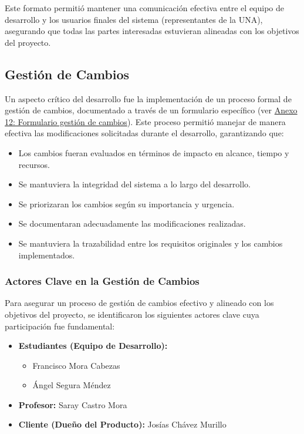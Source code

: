 Este formato permitió mantener una comunicación efectiva entre el equipo de desarrollo y los usuarios finales del sistema (representantes de la UNA), asegurando que todas las partes interesadas estuvieran alineadas con los objetivos del proyecto.

\subsection{Gestión de Cambios}
Un aspecto crítico del desarrollo fue la implementación de un proceso formal de gestión de cambios, documentado a través de un formulario específico (ver \hyperref[anexo:formulario_gestion_de_cambios]{Anexo 12: Formulario gestión de cambios}). Este proceso permitió manejar de manera efectiva las modificaciones solicitadas durante el desarrollo, garantizando que:

\begin{itemize}
    \item Los cambios fueran evaluados en términos de impacto en alcance, tiempo y recursos.
    \item Se mantuviera la integridad del sistema a lo largo del desarrollo.
    \item Se priorizaran los cambios según su importancia y urgencia.
    \item Se documentaran adecuadamente las modificaciones realizadas.
    \item Se mantuviera la trazabilidad entre los requisitos originales y los cambios implementados.
\end{itemize}

\subsubsection{Actores Clave en la Gestión de Cambios}
Para asegurar un proceso de gestión de cambios efectivo y alineado con los objetivos del proyecto, se identificaron los siguientes actores clave cuya participación fue fundamental:

\begin{itemize}
    \item \textbf{Estudiantes (Equipo de Desarrollo):}
        \begin{itemize}
            \item Francisco Mora Cabezas
            \item Ángel Segura Méndez
        \end{itemize}
    \item \textbf{Profesor:} Saray Castro Mora
    \item \textbf{Cliente (Dueño del Producto):} Josías Chávez Murillo
\end{itemize}

